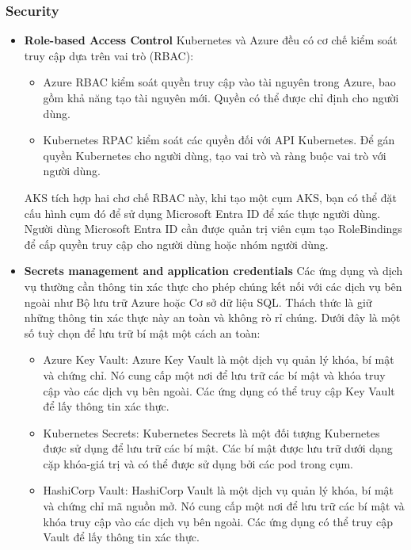 \subsubsection{Security}
\begin{itemize}
    \item \textbf{Role-based Access Control}
    \newline
    Kubernetes và Azure đều có cơ chế kiểm soát truy cập dựa trên vai trò (RBAC):
    \begin{itemize}
        \item Azure RBAC kiểm soát quyền truy cập vào tài nguyên trong Azure, bao gồm khả năng tạo tài nguyên mới. Quyền có thể được chỉ định cho người dùng.
        \item Kubernetes RPAC kiểm soát các quyền đối với API Kubernetes. Để gán quyền Kubernetes cho người dùng, tạo vai trò và ràng buộc vai trò với người dùng.
    \end{itemize}
    AKS tích hợp hai chơ chế RBAC này, khi tạo một cụm AKS, bạn có thể đặt cấu hình cụm đó để sử dụng Microsoft Entra ID để xác thực người dùng. Người dùng Microsoft Entra ID cần được quản trị viên cụm tạo RoleBindings để cấp quyền truy cập cho người dùng hoặc nhóm người dùng.
    \item \textbf{Secrets management and application credentials}
    \newline
    Các ứng dụng và dịch vụ thường cần thông tin xác thực cho phép chúng kết nối với các dịch vụ bên ngoài như Bộ lưu trữ Azure hoặc Cơ sở dữ liệu SQL. Thách thức là giữ những thông tin xác thực này an toàn và không rò rỉ chúng.
    Dưới đây là một số tuỳ chọn để lưu trữ bí mật một cách an toàn:
        \begin{itemize}
            \item Azure Key Vault: Azure Key Vault là một dịch vụ quản lý khóa, bí mật và chứng chỉ. Nó cung cấp một nơi để lưu trữ các bí mật và khóa truy cập vào các dịch vụ bên ngoài. Các ứng dụng có thể truy cập Key Vault để lấy thông tin xác thực.
            \item Kubernetes Secrets: Kubernetes Secrets là một đối tượng Kubernetes được sử dụng để lưu trữ các bí mật. Các bí mật được lưu trữ dưới dạng cặp khóa-giá trị và có thể được sử dụng bởi các pod trong cụm.
            \item HashiCorp Vault: HashiCorp Vault là một dịch vụ quản lý khóa, bí mật và chứng chỉ mã nguồn mở. Nó cung cấp một nơi để lưu trữ các bí mật và khóa truy cập vào các dịch vụ bên ngoài. Các ứng dụng có thể truy cập Vault để lấy thông tin xác thực.

\end{itemize}
\end{itemize}
